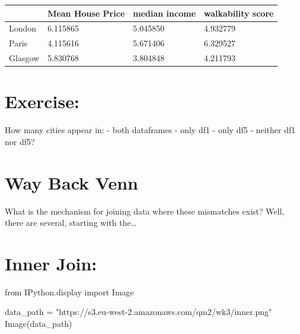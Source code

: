 \documentclass[
  letterpaper,
  DIV=11,
  numbers=noendperiod]{scrreprt}
\newenvironment{Shaded}{\begin{snugshade}}{\end{snugshade}}
\newcommand{\ImportTok}[1]{\textcolor[rgb]{0.00,0.46,0.62}{#1}}
\newcommand{\NormalTok}[1]{\textcolor[rgb]{0.00,0.23,0.31}{#1}}
\newcommand{\OperatorTok}[1]{\textcolor[rgb]{0.37,0.37,0.37}{#1}}
\newcommand{\StringTok}[1]{\textcolor[rgb]{0.13,0.47,0.30}{#1}}
\begin{document}
\begin{longtable}[]{@{}llll@{}}
\toprule()
& Mean House Price & median income & walkability score \\
\midrule()
\endhead
London & 6.115865 & 5.045850 & 4.932779 \\
Paris & 4.115616 & 5.671406 & 6.329527 \\
Glasgow & 5.830768 & 3.804848 & 4.211793 \\
\bottomrule()
\end{longtable}

\hypertarget{exercise-12}{%
\section{Exercise:}\label{exercise-12}}

How many cities appear in: - both dataframes - only df1 - only df5 -
neither df1 nor df5?

\hypertarget{way-back-venn}{%
\section{Way Back Venn}\label{way-back-venn}}

What is the mechanism for joining data where these mismatches exist?
Well, there are several, starting with the\ldots{}

\hypertarget{inner-join}{%
\section{Inner Join:}\label{inner-join}}

\begin{Shaded}
\begin{Highlighting}[]
\ImportTok{from}\NormalTok{ IPython.display }\ImportTok{import}\NormalTok{ Image}

\NormalTok{data\_path }\OperatorTok{=} \StringTok{"https://s3.eu{-}west{-}2.amazonaws.com/qm2/wk3/inner.png"}
\NormalTok{Image(data\_path)}
\end{Highlighting}
\end{Shaded}
\end{document}
